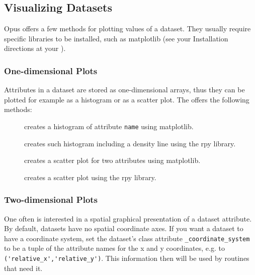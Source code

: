 \subsection{Visualizing Datasets}
%
Opus offers a few methods for plotting values of a dataset. \datasetindex They usually
require specific libraries to be installed, such as matplotlib (see your
Installation directions at your ).

\subsubsection{One-dimensional Plots}
%
Attributes \attributesindex in a dataset \datasetindex are stored as one-dimensional arrays, thus they can be
plotted for example as a histogram \histogramindex or as a scatter plot. \scatterplotindex The  
offers the following methods:

\begin{description}
\item[] \histogramindex creates a histogram \histogramindex of attribute \attributesindex
\verb|name| using matplotlib. \matplotlibindex
\item[] \rindex\histogramindex creates
such histogram \histogramindex including a density line using the rpy \rpyindex library.
\item[] \rindex\scatterplotindex creates a scatter plot \scatterplotindex for two
attributes \attributesindex using matplotlib. \matplotlibindex
\item[] \rindex\scatterplotindex creates a scatter plot \scatterplotindex 
using the rpy \rpyindex library.
\end{description}

\subsubsection{Two-dimensional Plots}
%
One often is interested in a spatial graphical presentation of a dataset
attribute.  By default, datasets have no spatial coordinate axes.  If you want
a dataset to have a coordinate system, set the dataset's class attribute
\verb|_coordinate_system| to be a tuple of the attribute names for the x and y
coordinates, e.g. to \verb|('relative_x','relative_y')|.  This information then
will be used by routines that need it.


